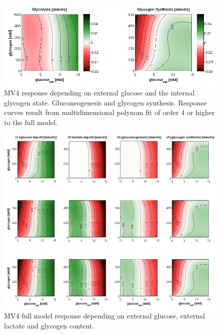 \begin{figure}[htp]
 \centering
 \includegraphics[width=400pt,keepaspectratio=true]{./figures/mv4_response_curves.png}
\caption{MV4 response depending on external glucose and the internal glycogen state. Gluconeogenesis and glycogen synthesis. Response curves result from multidimensional polynom fit of order 4 or higher to the full model.}
\label{fig: response}
\end{figure}

\begin{figure}[htp]
 \centering
 \includegraphics[width=400pt,keepaspectratio=true]{./figures/mv4_model_behavior.png}
\caption{MV4 full model response depending on external glucose, external lactate and glycogen content.}
\label{fig: behavior}
\end{figure}

